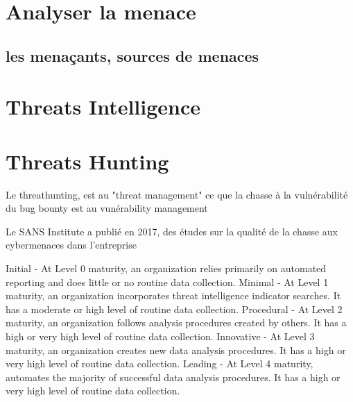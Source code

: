 
\section{Analyser la menace}



\subsection{les menaçants, sources de menaces}



\section{Threats Intelligence}


\section{Threats Hunting}


Le threathunting, est au "threat management"  ce que la chasse à la vulnérabilité du bug bounty est au vunérability management

Le SANS Institute a publié en 2017, des études sur la qualité de la chasse aux cybermenaces dans l'entreprise


Initial - At Level 0 maturity, an organization relies primarily on automated reporting and does little or no routine data collection.
Minimal - At Level 1 maturity, an organization incorporates threat intelligence indicator searches. It has a moderate or high level of routine data collection.
Procedural - At Level 2 maturity, an organization follows analysis procedures created by others. It has a high or very high level of routine data collection.
Innovative - At Level 3 maturity, an organization creates new data analysis procedures. It has a high or very high level of routine data collection.
Leading - At Level 4 maturity, automates the majority of successful data analysis procedures. It has a high or very high level of routine data collection.




